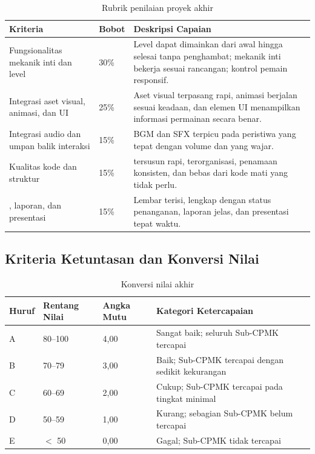 \begin{table}[htbp]
\centering
\caption{Rubrik penilaian proyek akhir}
\label{tab:rubrik-proyekakhir}
\begin{tabularx}{\textwidth}{@{}L{4.4cm} C{1.6cm} Y@{}}
\toprule
\headrow \textbf{Kriteria} & \textbf{Bobot} & \textbf{Deskripsi Capaian} \\
\midrule
Fungsionalitas mekanik inti dan level & 30\% &
Level dapat dimainkan dari awal hingga selesai tanpa penghambat; mekanik inti bekerja sesuai rancangan; kontrol pemain responsif. \\
\addlinespace
Integrasi aset visual, animasi, dan UI & 25\% &
Aset visual terpasang rapi, animasi berjalan sesuai keadaan, dan elemen UI menampilkan informasi permainan secara benar. \\
\addlinespace
Integrasi audio dan umpan balik interaksi & 15\% &
BGM dan SFX terpicu pada peristiwa yang tepat dengan volume dan  yang wajar. \\
\addlinespace
Kualitas kode dan struktur  & 15\% &
 tersusun rapi,  terorganisasi, penamaan konsisten, dan bebas dari kode mati yang tidak perlu. \\
\addlinespace
{}, laporan, dan presentasi & 15\% &
Lembar  terisi,  lengkap dengan status penanganan, laporan jelas, dan presentasi tepat waktu. \\
\bottomrule
\end{tabularx}
\end{table}

\subsection{Kriteria Ketuntasan dan Konversi Nilai}

\begin{table}[htbp]
\centering
\caption{Konversi nilai akhir}
\label{tab:konversi-nilai}
\begin{tabularx}{\textwidth}{@{}C{2.0cm} C{3.0cm} C{2.4cm} Y@{}}
\toprule
\headrow \textbf{Huruf} & \textbf{Rentang Nilai} & \textbf{Angka Mutu} & \textbf{Kategori Ketercapaian} \\
\midrule
A & 80--100 & 4,00 & Sangat baik; seluruh Sub-CPMK tercapai \\
B & 70--79  & 3,00 & Baik; Sub-CPMK tercapai dengan sedikit kekurangan \\
C & 60--69  & 2,00 & Cukup; Sub-CPMK tercapai pada tingkat minimal \\
D & 50--59  & 1,00 & Kurang; sebagian Sub-CPMK belum tercapai \\
E & $<$ 50  & 0,00 & Gagal; Sub-CPMK tidak tercapai \\
\bottomrule
\end{tabularx}
\end{table}

